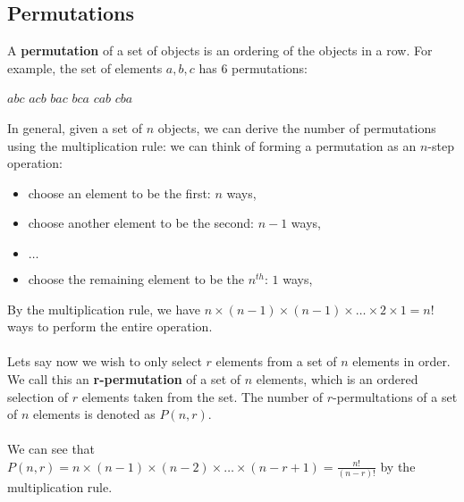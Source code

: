 \documentclass[a4paper]{article}
\begin{document}
\subsection{Permutations}
A \textbf{permutation} of a set of objects is an ordering of the objects in a row. For example, the set of elements $a, b, c$ has 6 permutations:
\begin{center}
	$abc$ $acb$ $bac$ $bca$ $cab$ $cba$
\end{center}
In general, given a set of $n$ objects, we can derive the number of permutations using the multiplication rule: we can think of forming a permutation as an $n$-step operation:
\begin{itemize}
	\item choose an element to be the first: $n$ ways,
	\item choose another element to be the second: $n-1$ ways,
	\item[] $\dots$
	\item choose the remaining element to be the $n^{th}$: $1$ ways,
\end{itemize}
By the multiplication rule, we have $n\times(n-1)\times(n-1)\times\dots\times 2 \times 1 = n!$ ways to perform the entire operation.\\\\
Lets say now we wish to only select $r$ elements from a set of $n$ elements in order. We call this an \textbf{r-permutation} of a set of $n$ elements, which is an ordered selection of $r$ elements taken from the set. The number of $r$-permultations of a set of $n$ elements is denoted as $P(n,r)$.\\ \\
We can see that $P(n,r) = n\times(n-1)\times(n-2)\times\dots\times(n-r+1) = \frac{n!}{(n-r)!}$ by the multiplication rule.
\end{document}
